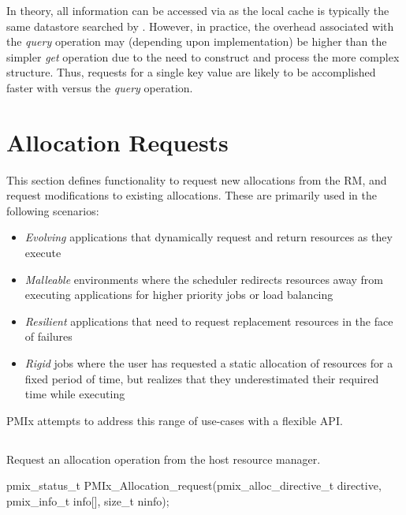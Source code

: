 In theory, all information can be accessed via  as the local cache is typically the same datastore searched by . However, in practice, the overhead associated with the \emph{query} operation may (depending upon implementation) be higher than the simpler \emph{get} operation due to the need to construct and process the more complex  structure. Thus, requests for a single key value are likely to be accomplished faster with  versus the \emph{query} operation.


\section{Allocation Requests}
\label{chap:api_job_mgmt:alloc}

This section defines functionality to request new allocations from the \ac{RM}, and request modifications to existing allocations.
These are primarily used in the following scenarios:
\begin{itemize}
\item \textit{Evolving} applications that dynamically request and return resources as they execute
\item \textit{Malleable} environments where the scheduler redirects resources away from executing applications for higher priority jobs or load balancing
\item \textit{Resilient} applications that need to request replacement resources in the face of failures
\item \textit{Rigid} jobs where the user has requested a static allocation of resources for a fixed period of time, but realizes that they underestimated their required time while executing
\end{itemize}
\ac{PMIx} attempts to address this range of use-cases with a flexible \ac{API}.

\subsection{}

\summary

Request an allocation operation from the host resource manager.

\format

\cspecificstart
\begin{codepar}
pmix_status_t
PMIx_Allocation_request(pmix_alloc_directive_t directive,
                        pmix_info_t info[], size_t ninfo);
\end{codepar}
\cspecificend

